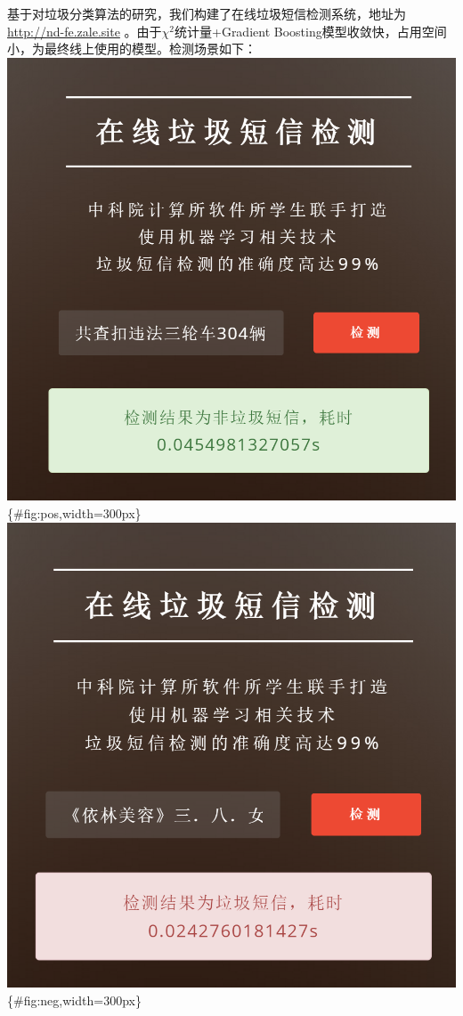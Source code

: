 \documentclass{article}
\begin{document}
基于对垃圾分类算法的研究，我们构建了在线垃圾短信检测系统，地址为\url{http://nd-fe.zale.site}
。由于\(\chi^2\)统计量+Gradient
Boosting模型收敛快，占用空间小，为最终线上使用的模型。检测场景如下：
\includegraphics{./images/res_pos.png}\{\#fig:pos,width=300px\}
\includegraphics{./images/res_neg.png}\{\#fig:neg,width=300px\}
\end{document}
